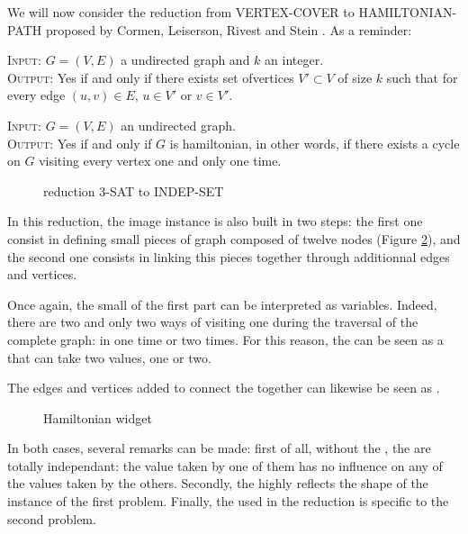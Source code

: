 We will now consider the reduction from VERTEX-COVER to
HAMILTONIAN-PATH proposed by Cormen, Leiserson, Rivest and Stein
\cite{cormen}. As a reminder:

\begin{definition}
  \textsc{Input:} $G=(V,E)$ a undirected graph and $k$ an integer. \\
  \textsc{Output:} Yes if and only if there exists set ofvertices $V'
  \subset V$ of size $k$ such that for every edge $(u,v) \in E$, $u
  \in V'$ or $v \in V'$.\\
\end{definition}

\begin{definition} 
  \textsc{Input:} $G=(V,E)$ an undirected graph.\\
  \textsc{Output:} Yes if and only if $G$ is hamiltonian, in other
  words, if there exists a cycle on $G$ visiting every vertex one and
  only one time.\\
\end{definition}

\begin{figure}
  \centering
  
  \caption{reduction 3-SAT to INDEP-SET}
  \label{fig:indep-set}
\end{figure}

In this reduction, the image instance is also built in two steps: the
first one consist in defining small pieces of graph composed of twelve
nodes (Figure \ref{fig:hamilton}), and the second one consists in
linking this pieces together through additionnal edges and
vertices. 

Once again, the small \widgets of the first part can be interpreted as
variables. Indeed, there are two and only two ways of visiting one
\widget during the traversal of the complete graph: in one time or two
times. For this reason, the \widget can be seen as a \variable that
can take two values, one or two.

The edges and vertices added to connect the \widgets together can
likewise be seen as \constraints.

\begin{figure}
  \centering
  
  \caption{Hamiltonian widget}
  \label{fig:hamilton}
\end{figure}

In both cases, several remarks can be made: first of all, without the
\constraints, the \widgets are totally independant: the value taken by
one of them has no influence on any of the values taken by the
others. Secondly, the \constraints highly reflects the shape of
the instance of the first problem. Finally, the \widget used in the
reduction is specific to the second problem.

